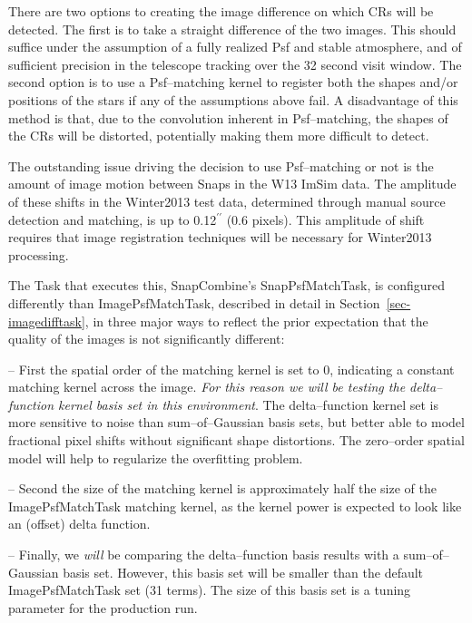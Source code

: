 \documentclass[12pt]{article}
\def\arcsec{^{\prime\prime}}
\begin{document}
There are two options to creating the image difference on which CRs
will be detected.  The first is to take a straight difference of the
two images.  This should suffice under the assumption of a fully
realized Psf and stable atmosphere, and of sufficient precision in the
telescope tracking over the 32 second visit window.  The second option
is to use a Psf--matching kernel to register both the shapes and/or
positions of the stars if any of the assumptions above fail.  A
disadvantage of this method is that, due to the convolution inherent
in Psf--matching, the shapes of the CRs will be distorted, potentially
making them more difficult to detect.

The outstanding issue driving the decision to use Psf--matching or not
is the amount of image motion between Snaps in the W13 ImSim data.
The amplitude of these shifts in the Winter2013 test data, determined
through manual source detection and matching, is up to 0.12$\arcsec$
(0.6 pixels).  This amplitude of shift requires that image
registration techniques will be necessary for Winter2013 processing.

The Task that executes this, SnapCombine's SnapPsfMatchTask, is
configured differently than ImagePsfMatchTask, described in detail in
Section~\ref{sec-imagedifftask}, in three major ways to reflect the
prior expectation that the quality of the images is not significantly
different:

-- First the spatial order of the matching kernel is set to 0,
indicating a constant matching kernel across the image.  {\it For this
  reason we will be testing the delta--function kernel basis set in
  this environment}.  The delta--function kernel set is more sensitive
to noise than sum--of--Gaussian basis sets, but better able to model
fractional pixel shifts without significant shape distortions.  The
zero--order spatial model will help to regularize the overfitting
problem.

-- Second the size of the matching kernel is approximately half the
size of the ImagePsfMatchTask matching kernel, as the kernel power is
expected to look like an (offset) delta function.

-- Finally, we {\it will} be comparing the delta--function basis
results with a sum--of--Gaussian basis set.  However, this basis set
will be smaller than the default ImagePsfMatchTask set (31 terms).
The size of this basis set is a tuning parameter for the production
run.
\end{document}
